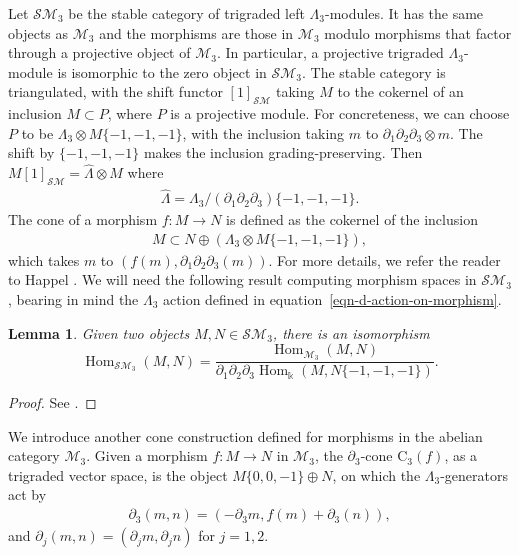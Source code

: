 \documentclass[pdftex]{sigma}
\newtheorem{lem}[thm]{Lemma}
\theoremstyle{definition}
\numberwithin{equation}{section}
\newcommand{\Hom}{\operatorname{Hom}}
\def\dif{\partial}
\def\lra{{\longrightarrow}}
\def\mc{\mathcal}
\begin{document}
Let $\mc{SM}_3$ be the stable category of trigraded left $\Lambda_3$-modules.
It has the same objects as $\mc{M}_3$ and the morphisms are those in
$\mc{M}_3$ modulo morphisms that factor through a projective object of $\mc{M}_3$.
In particular, a projective trigraded $\Lambda_3$-module is isomorphic to the
zero object in $\mc{SM}_3$. The stable category is triangulated, with the shift
functor $[1]_{\mc{SM}}$ taking $M$ to the cokernel of an inclusion $M\subset P$, where
$P$ is a projective module. For concreteness, we can choose $P$ to be $\Lambda_3\otimes M
\{-1,-1,-1\}$, with the inclusion taking $m$ to $\partial_1\partial_2\partial_3 \otimes m$.
The shift by $\{-1,-1,-1\}$ makes the inclusion grading-preserving.
Then $M[1]_{\mc{SM}}= \widehat{\Lambda}\otimes M$ where
\begin{gather*}\widehat{\Lambda} = \Lambda_3/(\partial_1\partial_2\partial_3) \{-1,-1,-1\}.\end{gather*}
The cone of a morphism $f\colon M \lra N$ is defined as the cokernel of the inclusion
\begin{gather*} M \subset N \oplus (\Lambda_3 \otimes M\{-1,-1,-1\}),\end{gather*}
which takes $m$ to $(f(m), \partial_1\partial_2\partial_3 (m))$. For more details, we refer the reader to Happel \cite{Ha}. We will need the following result computing morphism spaces in $\mc{SM}_3$, bearing in mind the $\Lambda_3$ action defined in equation~\eqref{eqn-d-action-on-morphism}.

\begin{lem}\label{lem-morphism-in-stable-cat}
Given two objects $M,N\in \mc{SM}_3$, there is an isomorphism
\[
\Hom_{\mc{SM}_3}(M,N)=\dfrac{\Hom_{\mc{M}_3}(M,N)}{\dif_1\dif_2\dif_3 \Hom_{\Bbbk}(M,N\{-1,-1,-1\})}.
\]
\end{lem}
\begin{proof}
See \cite[Corollary 5.5]{Q}.
\end{proof}

We introduce another cone construction defined for morphisms in the abelian category $\mc{M}_3$.
Given a morphism $f\colon M\lra N$ in $\mc{M}_3$, the $\dif_3$-cone $\mathrm{C}_3(f)$, as a trigraded vector space, is the object $M\{0,0,-1\} \oplus N$, on which the $\Lambda_3$-generators act by
\begin{gather}\label{eqn-d3-action-on-d3-cone}
 \partial_3(m,n)=(-\partial_3 m , f(m)+\partial_3(n)),
\end{gather}
and $\partial_j(m,n)=(\partial_j m, \partial_j n)$ for $j=1,2$.
\end{document}
